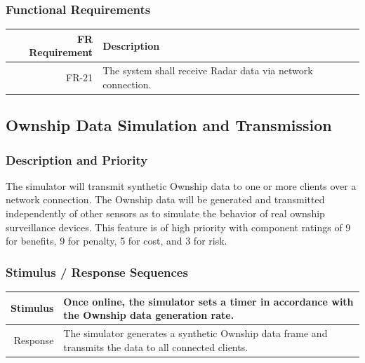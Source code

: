 \documentclass[12pt,oneside,letterpaper]{article}
\begin{document}
\subsubsection{Functional Requirements}
\begin{longtable}{|r|p{3.8in}|}
\hline
FR Requirement & Description \\
\hline
FR-21 & The system shall receive Radar data via network connection. \\
\hline
\end{longtable}

\subsection{Ownship Data Simulation and Transmission}
\subsubsection{Description and Priority}
The simulator will transmit synthetic Ownship data to one or more clients over a network connection. The Ownship data will be generated and transmitted independently of other sensors as to simulate the behavior of real ownship surveillance devices. This feature is of high priority with component ratings of 9 for benefits, 9 for penalty, 5 for cost, and 3 for risk.
\subsubsection{Stimulus / Response Sequences}
\begin{longtable}{|r|p{3.8in}|}
\hline
Stimulus & Once online, the simulator sets a timer in accordance with the Ownship data generation rate. \\
\hline
Response & The simulator generates a synthetic Ownship data frame and transmits the data to all connected clients. \\
\hline
\end{longtable}
\end{document}
